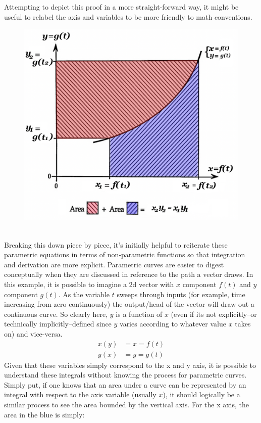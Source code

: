 \documentclass[11pt,a4paper]{article}
\begin{document}
Attempting to depict this proof in a more straight-forward way, it might be useful to relabel the axis and variables to be more friendly to math conventions. \\
\begin{figure}[h]
\begin{center}
\includegraphics[scale=.4]{modified proof of ibp} 
\end{center}
\end{figure} \\
Breaking this down piece by piece, it's initially helpful to reiterate these parametric equations in terms of non-parametric functions so that integration and derivation are more explicit. Parametric curves are easier to digest conceptually when they are discussed in reference to the path a vector draws. In this example, it is possible to imagine a 2d vector with $x$ component $f(t)$ and $y$ component $g(t)$.  As the variable $t$ sweeps through inputs (for example, time increasing from zero continuously) the output/head of the vector will draw out a continuous curve. So clearly here,  $y$ is a function of $x$ (even if its not explicitly--or technically implicitly--defined since $y$ varies according to whatever value $x$ takes on) and vice-versa.
\begin{align*}
x(y) &= x = f(t)\\
y(x) &= y = g(t)
\end{align*}
Given that these variables simply correspond to the x and y axis, it is possible to understand these integrals without knowing the process for parametric curves. Simply put, if one knows that an area under a curve can be represented by an integral with respect to the axis variable (usually $x$), it should logically be a similar process to see the area bounded by the vertical axis.  For the x axis, the area in the blue is simply:
\end{document}
